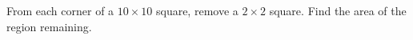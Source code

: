 From each corner of a $10\times10$ square, remove a $2\times2$ square. Find the area of the region remaining.
